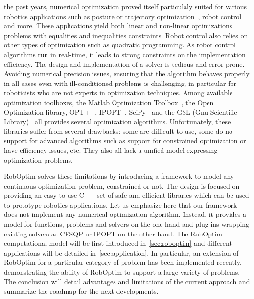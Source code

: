 \documentclass[conference,final,a4paper,twocolumn,9pt]{IEEEtran}
\begin{document}
 the past years, numerical optimization proved
itself particulaly suited for various robotics applications such as
posture or trajectory optimization~\cite{miossec06,saab-tro-12}, robot
control~\cite{mansard-icra-12} and more. These applications yield both
linear and non-linear optimizations problems with equalities and
inequalities constraints. Robot control also relies on other types of
optimization such as quadratic programming. As robot control
algorithms run in real-time, it leads to strong constraints on the
implementation efficiency. The design and implementation of a solver
is tedious and error-prone. Avoiding numerical precision issues,
ensuring that the algorithm behaves properly in all cases even with
ill-conditioned problems is challenging, in particular for roboticists
who are not experts in optimization techniques. Among available
optimization toolboxes, the Matlab Optimization Toolbox~\cite{matlab},
the Open Optimization library, OPT++, IPOPT~\cite{ipopt},
SciPy~\cite{scipy} and the GSL (Gnu Scientific Library)~\cite{gsl} all
provides several optimization algorithms. Unfortunately, these
libraries suffer from several drawbacks: some are difficult to use,
some do no support for advanced algorithms such as support for
constrained optimization or have efficiency issues, etc. They also all
lack a unified model expressing optimization problems.


RobOptim solves these limitations by introducing a framework to model
any continuous optimization problem, constrained or not. The design
is focused on providing an easy to use C++ set of safe and efficient
libraries which can be used to prototype robotics applications.
Let us emphasize here that our framework does not implement any numerical
optimization algorithm. Instead, it provides a model for functions, problems
and solvers on the one hand and plug-ins wrapping existing solvers as CFSQP
or IPOPT on the other hand.
The
RobOptim computational model will be first introduced
in~\autoref{sec:roboptim} and different applications will be detailed
in~\autoref{sec:application}. In particular, an extension of RobOptim
for a particular category of problem has been implemented recently,
demonstrating the ability of RobOptim to support a large variety of
problems. The conclusion will detail advantages and limitations of the
current approach and summarize the roadmap for the next developments.
\end{document}
